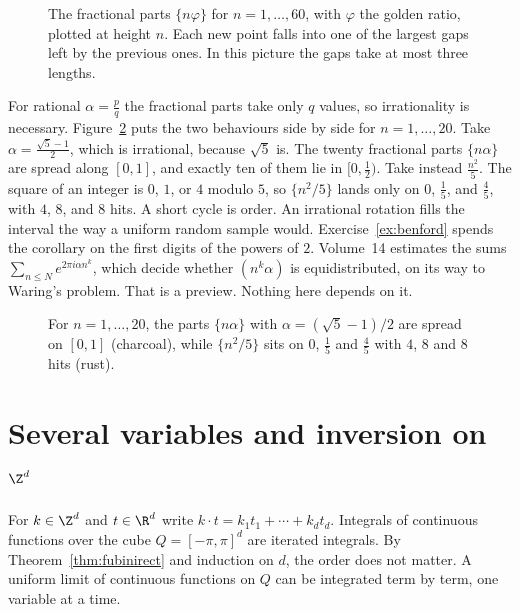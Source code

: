 \begin{figure}[ht]
\centering
{}
\caption{The fractional parts $\{n\varphi\}$ for $n=1,\dots,60$, with $\varphi$ the golden ratio, plotted at height $n$. Each new point
falls into one of the largest gaps left by the previous ones. In this picture the gaps take at most three lengths.}
\label{fig:weyl}
\end{figure}

For rational $\alpha=\frac pq$ the fractional parts take only $q$ values, so irrationality is necessary. Figure~\ref{fig:rw06-equi} puts the two behaviours side by side for $n=1,\ldots,20$. Take $\alpha=\frac{\sqrt5-1}2$, which is irrational, because $\sqrt5$ is. The twenty fractional parts $\{n\alpha\}$ are spread along $[0,1]$, and exactly ten of them lie in $[0,\frac12)$. Take instead $\frac{n^2}5$. The square of an integer is $0$, $1$, or $4$ modulo $5$, so $\{n^2/5\}$ lands only on $0$, $\frac15$, and $\frac45$, with $4$, $8$, and $8$ hits. A short cycle is order. An irrational rotation fills the interval the way a uniform random sample would. Exercise~\ref{ex:benford} spends the corollary on the first digits of the powers of $2$. Volume~14 estimates the sums $\sum_{n\le N}e^{2\pi i\alpha n^k}$, which decide whether $(n^k\alpha)$ is equidistributed, on its way to Waring's problem. That is a preview. Nothing here depends on it.

\begin{figure}[ht]
\centering
{}
\caption{For $n=1,\ldots,20$, the parts $\{n\alpha\}$ with $\alpha=(\sqrt5-1)/2$ are spread on $[0,1]$ (charcoal), while $\{n^2/5\}$ sits on $0$, $\frac15$ and $\frac45$ with $4$, $8$ and $8$ hits (rust).}
\label{fig:rw06-equi}
\end{figure}

\section{Several variables and inversion on \texorpdfstring{$\Z^d$}{Zd}}

For $k\in\Z^d$ and $t\in\R^d$ write $k\cdot t=k_1t_1+\cdots+k_dt_d$. Integrals of continuous functions over the cube $Q=[-\pi,\pi]^d$ are iterated integrals. By Theorem~\ref{thm:fubinirect} and induction on $d$, the order does not matter. A uniform limit of continuous functions on $Q$ can be integrated term by term, one variable at a time.

